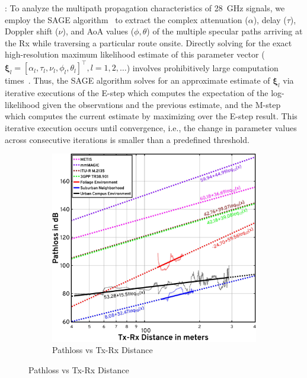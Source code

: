 \documentclass[12pt, draftcls, onecolumn]{IEEEtran}
\begin{document}
{: To analyze the multipath propagation characteristics of \SI{28}{\giga\hertz} signals, we employ the SAGE algorithm~\cite{SAGE} to extract the complex attenuation ($\alpha$), delay ($\tau$), Doppler shift ($\nu$), and AoA values ($\phi,\theta$) of the multiple specular paths arriving at the Rx while traversing a particular route onsite. Directly solving for the exact high-resolution maximum likelihood estimate of this parameter vector ($\boldsymbol{\xi}_{l}{=}[\alpha_{l},\tau_{l},\nu_{l},\phi_{l},\theta_{l}]^{\intercal},l{=}1,2,{\dots}$) involves prohibitively large computation times~\cite{SAGE}. Thus, the SAGE algorithm solves for an approximate estimate of $\boldsymbol{\xi}_{l}$ via iterative executions of the E-step which computes the expectation of the log-likelihood given the observations and the previous estimate, and the M-step which computes the current estimate by maximizing over the E-step result. This iterative execution occurs until convergence, i.e., the change in parameter values across consecutive iterations is smaller than a predefined threshold.
\begin{figure} [t]
    \centering
    \begin{subfigure}{0.49\linewidth}
        \centering
        \includegraphics[width=1.0\linewidth]{figs/pathloss_vs_distance.pdf}
        \caption{Pathloss vs Tx-Rx Distance}
        \label{F7a}
    \end{subfigure}

\end{figure}}
\end{document}
